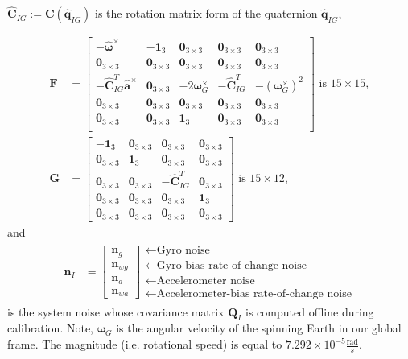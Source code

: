 \documentclass[10pt,letterpaper,fleqn,oneside]{article}
\newcommand{\nl}{\\[0.5em]}
\def\Vec#1{\mathbf{#1}} %
\newcommand{\bbm}{\begin{bmatrix}}
\newcommand{\ebm}{\end{bmatrix}}
\begin{document}
$\hat{\Vec{C}}_{I G} := \Vec{C}(\hat{\Vec{q}}_{I G})$ is the rotation matrix form of the quaternion $\hat{\Vec{q}}_{I G}$,

\begin{align}
\Vec{F} &= \bbm	-\hat{\boldsymbol{\omega}}^\times & -\Vec{1}_3 & \Vec{0}_{3\times3} & \Vec{0}_{3\times3} & \Vec{0}_{3\times3} \nl
					\Vec{0}_{3\times3} & \Vec{0}_{3\times3} & \Vec{0}_{3\times3} & \Vec{0}_{3\times3} & \Vec{0}_{3\times3} \nl
					-\hat{\Vec{C}}_{I G}^T\hat{\Vec{a}}^\times & \Vec{0}_{3\times3} & -2\boldsymbol{\omega}_G^\times & -\hat{\Vec{C}}_{I G}^T & -\left(\boldsymbol{\omega}_G^\times\right)^2 \nl
					\Vec{0}_{3\times3} & \Vec{0}_{3\times3} & \Vec{0}_{3\times3} & \Vec{0}_{3\times3} & \Vec{0}_{3\times3} \nl
					\Vec{0}_{3\times3} & \Vec{0}_{3\times3} & \Vec{1}_3 & \Vec{0}_{3\times3} & \Vec{0}_{3\times3} \nl
		\ebm \text{ is } 15\times15, \nl
\Vec{G} &= 	\bbm	-\Vec{1}_3 & \Vec{0}_{3\times3} & \Vec{0}_{3\times3} & \Vec{0}_{3\times3} \nl
								\Vec{0}_{3\times3} & \Vec{1}_3 & \Vec{0}_{3\times3} & \Vec{0}_{3\times3} \nl
								\Vec{0}_{3\times3} & \Vec{0}_{3\times3} & -\hat{\Vec{C}}_{I G}^T & \Vec{0}_{3\times3} \nl
								\Vec{0}_{3\times3} & \Vec{0}_{3\times3} & \Vec{0}_{3\times3} & \Vec{1}_3 \nl
								\Vec{0}_{3\times3} & \Vec{0}_{3\times3} & \Vec{0}_{3\times3} & \Vec{0}_{3\times3}
					\ebm \text{ is } 15\times12,
\end{align}
and
\begin{align}
\Vec{n}_I &= \bbm \Vec{n}_g \nl \Vec{n}_{wg} \nl \Vec{n}_a \nl \Vec{n}_{wa} \ebm
					\begin{array}{l}
					\leftarrow \text{Gyro noise} \nl
					\leftarrow \text{Gyro-bias rate-of-change noise} \nl
					\leftarrow \text{Accelerometer noise} \nl
					\leftarrow \text{Accelerometer-bias rate-of-change noise}
					\end{array}		
\end{align}
is the system noise whose covariance matrix $\Vec{Q}_I$ is computed offline during calibration. Note, $\pmb{\omega}_G$ is the angular velocity of the spinning Earth in our global frame. The magnitude (i.e. rotational speed) is equal to $7.292 \times 10^{−5} \frac{\text{rad}}{s}$. 
\end{document}
